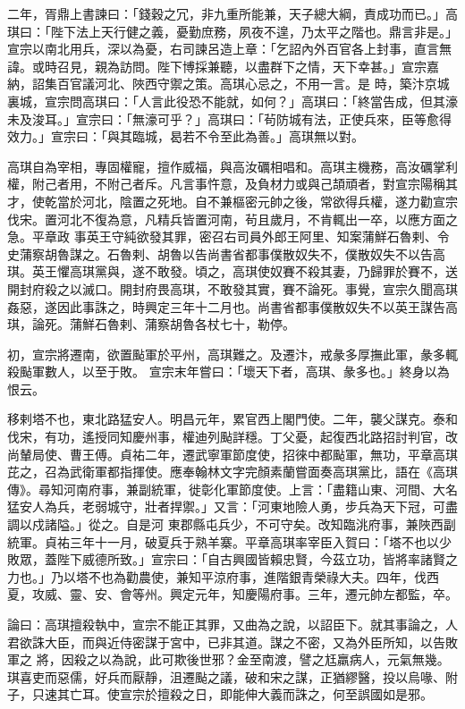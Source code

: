 \begin{pinyinscope}
 二年，胥鼎上書諫曰：「錢穀之冗，非九重所能兼，天子總大綱，責成功而已。」高琪曰：「陛下法上天行健之義，憂勤庶務，夙夜不遑，乃太平之階也。鼎言非是。」宣宗以南北用兵，深以為憂，右司諫呂造上章：「乞詔內外百官各上封事，直言無諱。或時召見，親為訪問。陛下博採兼聽，以盡群下之情，天下幸甚。」宣宗嘉納，詔集百官議河北、陜西守禦之策。高琪心忌之，不用一言。是
 時，築汴京城裏城，宣宗問高琪曰：「人言此役恐不能就，如何？」高琪曰：「終當告成，但其濠未及浚耳。」宣宗曰：「無濠可乎？」高琪曰：「茍防城有法，正使兵來，臣等愈得效力。」宣宗曰：「與其臨城，曷若不令至此為善。」高琪無以對。



 高琪自為宰相，專固權寵，擅作威福，與高汝礪相唱和。高琪主機務，高汝礪掌利權，附己者用，不附己者斥。凡言事忤意，及負材力或與己頡頑者，對宣宗陽稱其才，使乾當於河北，陰置之死地。自不兼樞密元帥之後，常欲得兵權，遂力勸宣宗伐宋。置河北不復為意，凡精兵皆置河南，茍且歲月，不肯輒出一卒，以應方面之急。平章政
 事英王守純欲發其罪，密召右司員外郎王阿里、知案蒲鮮石魯剌、令史蒲察胡魯謀之。石魯剌、胡魯以告尚書省都事僕散奴失不，僕散奴失不以告高琪。英王懼高琪黨與，遂不敢發。頃之，高琪使奴賽不殺其妻，乃歸罪於賽不，送開封府殺之以滅口。開封府畏高琪，不敢發其實，賽不論死。事覺，宣宗久聞高琪姦惡，遂因此事誅之，時興定三年十二月也。尚書省都事僕散奴失不以英王謀告高琪，論死。蒲鮮石魯剌、蒲察胡魯各杖七十，勒停。



 初，宣宗將遷南，欲置颭軍於平州，高琪難之。及遷汴，戒彖多厚撫此軍，彖多輒殺颭軍數人，以至于敗。
 宣宗末年嘗曰：「壞天下者，高琪、彖多也。」終身以為恨云。



 移剌塔不也，東北路猛安人。明昌元年，累官西上閣門使。二年，襲父謀克。泰和伐宋，有功，遙授同知慶州事，權迪列颭詳穩。丁父憂，起復西北路招討判官，改尚輦局使、曹王傅。貞祐二年，遷武寧軍節度使，招徠中都颭軍，無功，平章高琪芘之，召為武衛軍都指揮使。應奉翰林文字完顏素蘭嘗面奏高琪黨比，語在《高琪傳》。尋知河南府事，兼副統軍，徙彰化軍節度使。上言：「盡籍山東、河間、大名猛安人為兵，老弱城守，壯者捍禦。」又言：「河東地險人勇，步兵為天下冠，可盡調以戍諸隘。」從之。自是河
 東郡縣屯兵少，不可守矣。改知臨洮府事，兼陜西副統軍。貞祐三年十一月，破夏兵于熟羊寨。平章高琪率宰臣入賀曰：「塔不也以少敗眾，蓋陛下威德所致。」宣宗曰：「自古興國皆賴忠賢，今茲立功，皆將率諸賢之力也。」乃以塔不也為勸農使，兼知平涼府事，進階銀青榮祿大夫。四年，伐西夏，攻威、靈、安、會等州。興定元年，知慶陽府事。三年，遷元帥左都監，卒。



 論曰：高琪擅殺執中，宣宗不能正其罪，又曲為之說，以詔臣下。就其事論之，人君欲誅大臣，而與近侍密謀于宮中，已非其道。謀之不密，又為外臣所知，以告敗軍之
 將，因殺之以為說，此可欺後世邪？金至南渡，譬之尪羸病人，元氣無幾。琪喜吏而惡儒，好兵而厭靜，沮遷颭之議，破和宋之謀，正猶繆醫，投以烏喙、附子，只速其亡耳。使宣宗於擅殺之日，即能伸大義而誅之，何至誤國如是邪。



\end{pinyinscope}